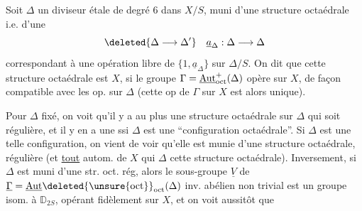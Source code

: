 Soit \(\Delta\) un diviseur étale de degré \(6\) dans \(X/S\), muni d'une structure octaédrale i.e. d'une   
\[
 \deleted{\Delta\longrightarrow\Delta'}\quad \underline{a}_{\Delta}:\Delta\longrightarrow\Delta
\]
 correspondant à une opération libre de \(\{1,\underline{a}_{\Delta}\}\) sur \(\Delta/S\). On dit que cette structure octaédrale est   \(X\), si le groupe \(\Gamma=\underline{\operatorname{Aut}}_{\rm oct}^{+}(\Delta)\) opère sur \(X\), de façon compatible avec les op. sur \(\Delta\) (cette op de \(\Gamma\) sur \(X\) est alors unique).

 Pour \(\Delta\)  fixé, on voit qu'il y a au plus une structure octaédrale sur \(\Delta\) qui soit régulière, et il y en a une ssi \(\Delta\) est une ``configuration octaédrale''. Si \(\Delta\) est une telle configuration, on vient de voir  qu'elle est munie d'une  structure octaédrale, régulière (et \uline{tout} autom. de \(X\) qui   \(\Delta\)   cette structure octaédrale).
Inversement, si \(\Delta\) est muni d'une str. oct. rég, alors le sous-groupe \(\underline V\) de \(\underline\Gamma=\underline{\operatorname{Aut}}\deleted{\unsure{\rm oct}}_{\rm oct}(\Delta)\) inv. abélien non trivial est un groupe  isom. à \(\mathbb D_{2S}\), opérant fidèlement sur \(X\), et on voit aussitôt que 
